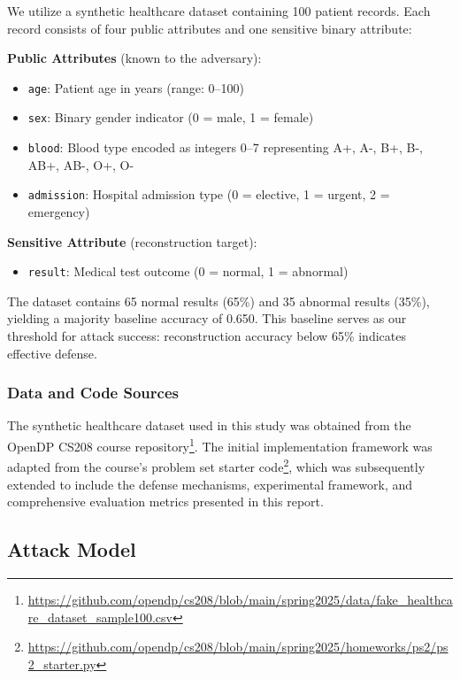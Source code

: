 \documentclass[11pt,letterpaper]{article}
\begin{document}
We utilize a synthetic healthcare dataset containing 100 patient records. Each record consists of four public attributes and one sensitive binary attribute:

\textbf{Public Attributes} (known to the adversary):
\begin{itemize}[leftmargin=*]
    \item \texttt{age}: Patient age in years (range: 0--100)
    \item \texttt{sex}: Binary gender indicator (0 = male, 1 = female)
    \item \texttt{blood}: Blood type encoded as integers 0--7 representing A+, A-, B+, B-, AB+, AB-, O+, O-
    \item \texttt{admission}: Hospital admission type (0 = elective, 1 = urgent, 2 = emergency)
\end{itemize}

\textbf{Sensitive Attribute} (reconstruction target):
\begin{itemize}[leftmargin=*]
    \item \texttt{result}: Medical test outcome (0 = normal, 1 = abnormal)
\end{itemize}

The dataset contains 65 normal results (65\%) and 35 abnormal results (35\%), yielding a majority baseline accuracy of 0.650. This baseline serves as our threshold for attack success: reconstruction accuracy below 65\% indicates effective defense.

\subsubsection{Data and Code Sources}

The synthetic healthcare dataset used in this study was obtained from the OpenDP CS208 course repository\footnote{\url{https://github.com/opendp/cs208/blob/main/spring2025/data/fake_healthcare_dataset_sample100.csv}}. The initial implementation framework was adapted from the course's problem set starter code\footnote{\url{https://github.com/opendp/cs208/blob/main/spring2025/homeworks/ps2/ps2_starter.py}}, which was subsequently extended to include the defense mechanisms, experimental framework, and comprehensive evaluation metrics presented in this report.


\subsection{Attack Model}
\end{document}

